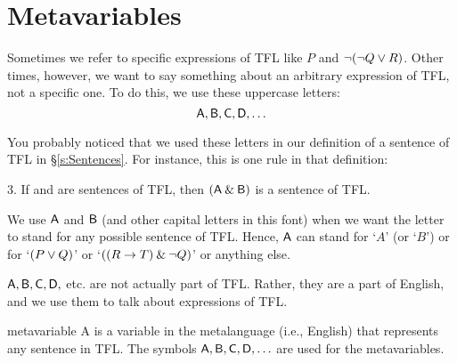 \begin{comment}
Whenever we want to talk, in English, about some specific expression of TFL, we need to indicate that we are \textit{mentioning} the expression, rather than \textit{using} it. We can do this by using single quotation marks or italics (although italics are also sometimes used simply for emphasis and not to indicate that we are mentioning a term or sentence). In this textbook, we will also indicate that we are mentioning an expression by placing it centered on the page like this:
\vspace{-2mm}
$$\enot(\enot Q \eor R)$$

\end{comment}


\section{Metavariables}\label{s:Metavariables}

Sometimes we refer to specific expressions of TFL like $P$ and ${\neg} ({\neg} Q \vee R)$. Other times, however, we want to say something about an arbitrary expression of TFL, not a specific one. To do this, we use these uppercase letters:
\vspace{-2mm}
	$$\mathsf{A}, \mathsf{B}, \mathsf{C}, \mathsf{D}, \ldots$$
	
You probably noticed that we used these letters in our definition of a sentence of TFL in \S\ref{s:Sentences}. For instance, this is one rule in that definition:
\begin{earg}
\item[3.] If  and  are sentences of TFL, then $(\mathsf{A}\mathbin{\&}\mathsf{B})$ is a sentence of TFL.
\end{earg}
We use $\mathsf{A}$ and $\mathsf{B}$ (and other capital letters in this font) when we want the letter to stand for any possible sentence of TFL. Hence, $\mathsf{A}$ can stand for `$A$' (or `$B$') or for `$(P \vee Q)$' or `$((R \rightarrow T) \mathbin{\&} {\neg} Q)$' or anything else. 

$\mathsf{A}, \mathsf{B}, \mathsf{C}, \mathsf{D},$ etc. are not actually part of TFL. Rather, they are a part of  English, and we use them to talk about expressions of TFL. 
	
\begin{factboxy}{metavariable}
A  is a variable in the metalanguage (i.e., English) that represents any sentence in TFL. The symbols $\mathsf{A}, \mathsf{B}, \mathsf{C}, \mathsf{D}, \ldots$ are used for the metavariables.
\end{factboxy}

